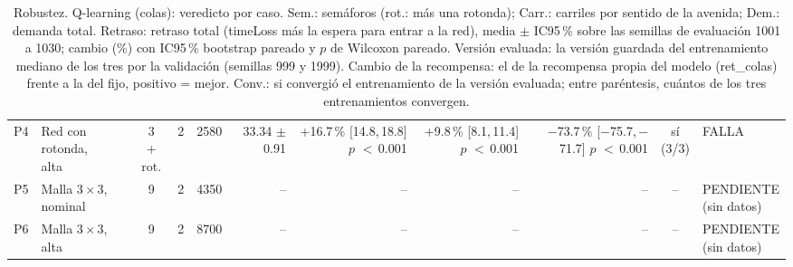 \begin{table}[H]
\begin{tabular}{llcrrrrrrcl}
P4 & \makecell[l]{Red con\\{}rotonda,\\{}alta} & \makecell[c]{3\\{}+ rot.} & 2 & 2580 & \makecell[r]{33.34\\{}$\pm$ 0.91} & \makecell[r]{+16.7\,\%\\{}[14.8,\,18.8]\\$p$ $<$\,0.001} & \makecell[r]{+9.8\,\%\\{}[8.1,\,11.4]\\$p$ $<$\,0.001} & \makecell[r]{$-$73.7\,\%\\{}[$-$75.7,\,$-$71.7]\\$p$ $<$\,0.001} & \makecell[c]{sí\\{}(3/3)} & FALLA \\
P5 & \makecell[l]{Malla $3 \times 3$,\\{}nominal} & 9 & 2 & 4350 & -- & -- & -- & -- & -- & \makecell[l]{PENDIENTE\\{}(sin datos)} \\
P6 & \makecell[l]{Malla $3 \times 3$,\\{}alta} & 9 & 2 & 8700 & -- & -- & -- & -- & -- & \makecell[l]{PENDIENTE\\{}(sin datos)} \\
\bottomrule
\end{tabular}
\caption[Robustez: veredicto de Q-learning (colas)]{Robustez. Q-learning (colas): veredicto por caso. Sem.: semáforos (rot.: más una rotonda); Carr.: carriles por sentido de la avenida; Dem.: demanda total. Retraso: retraso total (timeLoss más la espera para entrar a la red), media $\pm$ IC95\,\% sobre las semillas de evaluación 1001 a 1030; cambio (\%) con IC95\,\% bootstrap pareado y $p$ de Wilcoxon pareado. Versión evaluada: la versión guardada del entrenamiento mediano de los tres por la validación (semillas 999 y 1999). Cambio de la recompensa: el de la recompensa propia del modelo (ret\_colas) frente a la del fijo, positivo = mejor. Conv.: si convergió el entrenamiento de la versión evaluada; entre paréntesis, cuántos de los tres entrenamientos convergen.}
\label{tab:robustez-veredicto-ql-colas}
\end{table}
